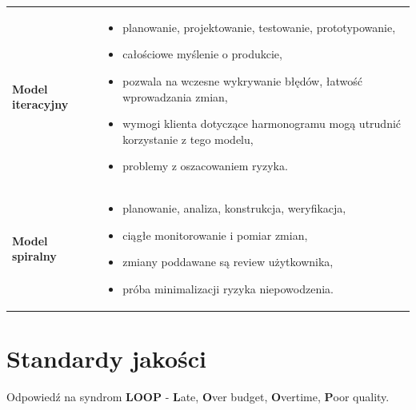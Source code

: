 \documentclass[a4paper]{article}
\begin{document}
\begin{table}[H]
\begin{center}
\begin{tabular}{ p{4cm} p{11cm}  }
                \cmidrule(r){1-1}\cmidrule(l){2-2}

                \textbf{Model iteracyjny}
                &
                \begin{itemize}
                    \item planowanie, projektowanie, testowanie, prototypowanie,
                    \item całościowe myślenie o produkcie,
                    \item pozwala na wczesne wykrywanie błędów, łatwość wprowadzania zmian,
                    \item wymogi klienta dotyczące harmonogramu mogą utrudnić korzystanie z tego
                    modelu,
                    \item problemy z oszacowaniem ryzyka.
                \end{itemize}
                \\

                \cmidrule(r){1-1}\cmidrule(l){2-2}

                \textbf{Model spiralny}
                &
                \begin{itemize}
                    \item planowanie, analiza, konstrukcja, weryfikacja,
                    \item ciągłe monitorowanie i pomiar zmian,
                    \item zmiany poddawane są review użytkownika,
                    \item próba minimalizacji ryzyka niepowodzenia.
                \end{itemize}
                \\

            \end{tabular}
        \end{center}
    \end{table}

    \section{Standardy jakości}

    Odpowiedź na syndrom \textbf{LOOP} - \textbf{L}ate, \textbf{O}ver budget, \textbf{O}vertime, \textbf{P}oor quality.
\end{document}
